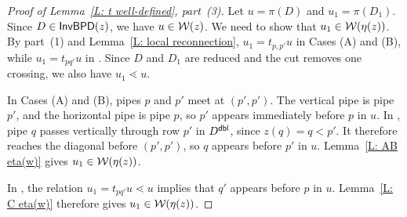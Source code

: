 \documentclass[10pt]{article}
\begin{document}
\begin{proof}[Proof of Lemma~\ref{L: t well-defined}, part~(3)]
Let $u=\pi(D)$ and $u_1=\pi(D_1)$.
Since $D\in\mathsf{InvBPD}(z)$, we have $u\in\mathcal{W}(z)$.
We need to show that $u_1\in\mathcal{W}(\eta(z))$.
By part~(1) and Lemma~\ref{L: local reconnection},
$u_1=t_{p,p'}u$ in Cases (A) and (B), while $u_1=t_{pq'}u$ in \CaseC.
Since $D$ and $D_1$ are reduced and the cut removes one crossing,
we also have $u_1\lessdot u$.

In Cases (A) and (B), pipes $p$ and $p'$ meet at $(p',p')$.
The vertical pipe is pipe $p'$, and the horizontal pipe is pipe $p$,
so $p'$ appears immediately before $p$ in $u$.
In \CaseB, pipe $q$ passes vertically through row $p'$ in $D^{\mathsf{dbl}}$,
since $z(q)=q<p'$.
It therefore reaches the diagonal before $(p',p')$, so $q$ appears
before $p'$ in $u$.
Lemma~\ref{L: AB eta(w)} gives $u_1\in\mathcal{W}(\eta(z))$.

In \CaseC, the relation $u_1=t_{pq'}u\lessdot u$ implies that
$q'$ appears before $p$ in $u$.
Lemma~\ref{L: C eta(w)} therefore gives $u_1\in\mathcal{W}(\eta(z))$.
\end{proof}
\end{document}
